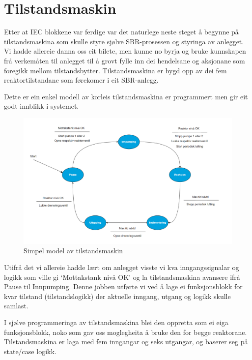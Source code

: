 \section{Tilstandsmaskin}
\thispagestyle{fancy}

Etter at IEC blokkene var ferdige var det naturlege neste steget å begynne på tilstandsmaskina som skulle styre sjølve SBR-prosessen
og styringa av anlegget. Vi hadde allereie danna oss eit bilete, men kunne no byrja og bruke kunnskapen frå verkemåten til anlegget
til å grovt fylle inn dei hendelsane og aksjonane som foregikk mellom tilstandsbytter. 
Tilstandsmaskina er bygd opp av dei fem reaktortilstandane som førekomer i eit SBR-anlegg.

Dette er ein enkel modell av korleis tilstandsmaskina er programmert men gir eit godt innblikk i systemet.

\begin{figure}[htbp]
    \centering
    \includegraphics[width=1\textwidth]{Figurar/Simpel tilstandsmaskin.png}
    \caption{Simpel model av tilstandsmaskin}\label{fig:reaktorsoner}
\end{figure}

Utifrå det vi allereie hadde lært om anlegget visste vi kva inngangssignalar og logikk som ville gi
`Mottakstank nivå OK' og la tilstandsmaskina avansere ifrå Pause til Innpumping. Denne jobben utførte vi ved å lage ei
funksjonsblokk for kvar tilstand (tilstandslogikk) der aktuelle inngang, utgang og logikk skulle samlast.

\newpage

I sjølve programmeringa av tilstandsmaskina blei den oppretta som ei eiga funksjonsblokk, noko som gav oss moglegheita å bruke den for begge reaktorane.
Tilstandsmaskina er laga med fem inngangar og seks utgangar, og baserer seg på state/case logikk.

